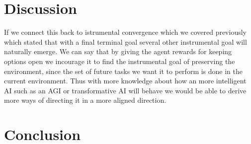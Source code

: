 \documentclass[12pt,A4]{report}
\theoremstyle{definition}
\begin{document}
\chapter{Discussion}
If we connect this back to istrumental convergence which we covered previously which stated that with a final terminal goal several other instrumental goal will naturally emerge. We can say that by giving the agent rewards for keeping options open we incourage it to find the instrumental goal of preserving the environment, since the set of future tasks we want it to perform is done in the current environment. Thus with more knowledge about how an more intelligent AI such as an AGI or transformative AI will behave we would be able to derive more ways of directing it in a more aligned direction.







\chapter{Conclusion}




\end{document}
